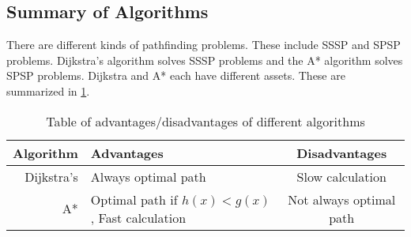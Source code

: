   \subsection{Summary of Algorithms}

  There are different kinds of pathfinding problems. These include SSSP and SPSP problems. Dijkstra's algorithm solves SSSP problems and the A* algorithm solves SPSP problems. Dijkstra and A* each have different assets. These are summarized in \cref{tbl:scheme}.
  
  \begin{table}[ht!]
    \centering
    \begin{tabular}{|r|l|c|}

      \hline
      \textbf{Algorithm} & \textbf{Advantages} & \textbf{Disadvantages} \\
      \hline
      Dijkstra's & Always optimal path & Slow calculation \\
      A* & Optimal path if $h(x)<g(x)$, Fast calculation & Not always optimal path \\
      \hline
    \end{tabular}
    \caption{Table of advantages/disadvantages of different algorithms}
    \label{tbl:scheme}
  \end{table}